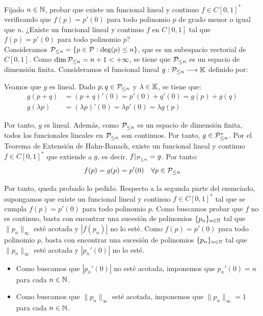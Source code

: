 \begin{ejercicio}
    Fijado $n \in \mathbb{N}$, probar que existe un funcional lineal y continuo $f\in C\left[0, 1\right]^*$ verificando que $f(p) = p'(0)$ para todo polinomio $p$ de grado menor o igual que $n$. ¿Existe un funcional lineal y continuo $f$ en $C\left[0, 1\right]$ tal que $f(p) = p'(0)$ para todo polinomio $p$?\\

    Consideramos $\mathcal{P}_{\leq n} = \{p \in \mathcal{P} : \deg(p) \leq n\}$, que es un subespacio vectorial de $C[0, 1]$. Como $\dim \mathcal{P}_{\leq n} = n + 1 < +\infty$, se tiene que $\mathcal{P}_{\leq n}$ es un espacio de dimensión finita. Consideramos el funcional lineal $g: \mathcal{P}_{\leq n} \longrightarrow \mathbb{K}$ definido por:

    Veamos que $g$ es lineal. Dado $p, q \in \mathcal{P}_{\leq n}$ y $\lambda \in \mathbb{K}$, se tiene que:
    \begin{align*}
        g(p + q) &= (p + q)'(0) = p'(0) + q'(0) = g(p) + g(q) \\
        g(\lambda p) &= (\lambda p)'(0) = \lambda p'(0) = \lambda g(p)
    \end{align*}

    Por tanto, $g$ es lineal. Además, como $\mathcal{P}_{\leq n}$ es un espacio de dimensión finita, todos los funcionales lineales en $\mathcal{P}_{\leq n}$ son continuos. Por tanto, $g \in \mathcal{P}_{\leq n}^*$. Por el Teorema de Extensión de Hahn-Banach, existe un funcional lineal y continuo $f \in C[0, 1]^*$ que extiende a $g$, es decir, $f|_{\mathcal{P}_{\leq n}} = g$. Por tanto:
    \[
        f(p) = g(p) = p'(0) \quad \forall p \in \mathcal{P}_{\leq n}
    \]

    Por tanto, queda probado lo pedido. Respecto a la segunda parte del enunciado, supongamos que existe un funcional lineal y continuo $f \in C[0, 1]^*$ tal que se cumpla $f(p) = p'(0)$ para todo polinomio $p$. Como buscamos probar que $f$ no es continuo, basta con encontrar una sucesión de polinomios $\{p_n\}_{n \in \mathbb{N}}$ tal que $\|p_n\|_\infty$ esté acotada y $|f(p_n)|$ no lo esté. Como $f(p) = p'(0)$ para todo polinomio $p$, basta con encontrar una sucesión de polinomios $\{p_n\}_{n \in \mathbb{N}}$ tal que $\|p_n\|_\infty$ esté acotada y $|p_n'(0)|$ no lo esté.
    \begin{itemize}
        \item Como buscamos que $|p_n'(0)|$ no esté acotada, imponemos que $p_n'(0) = n$ para cada $n \in \mathbb{N}$.
        \item Como buscamos que $\|p_n\|_\infty$ esté acotada, imponemos que $\|p_n\|_\infty = 1$ para cada $n \in \mathbb{N}$.
    \end{itemize}
    

\end{ejercicio}
